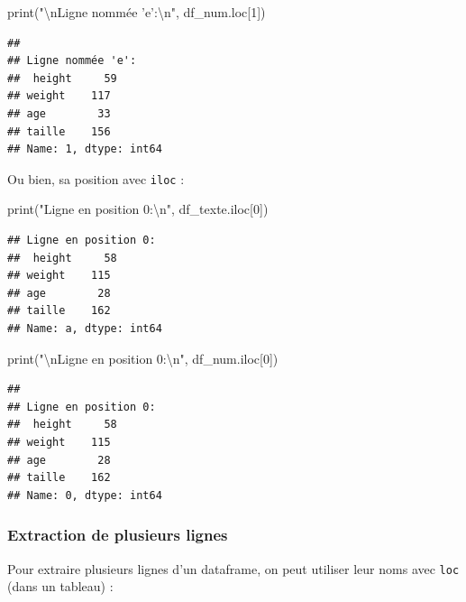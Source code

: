\documentclass[12pt,]{book}
\newenvironment{Shaded}{\begin{snugshade}}{\end{snugshade}}
\newcommand{\DecValTok}[1]{\textcolor[rgb]{0.00,0.00,0.81}{#1}}
\newcommand{\CharTok}[1]{\textcolor[rgb]{0.31,0.60,0.02}{#1}}
\newcommand{\StringTok}[1]{\textcolor[rgb]{0.31,0.60,0.02}{#1}}
\newcommand{\BuiltInTok}[1]{#1}
\newcommand{\NormalTok}[1]{#1}
\numberwithin{equation}{section}
\numberwithin{countremarque}{section}
\begin{document}
\begin{Shaded}
\begin{Highlighting}[]
\BuiltInTok{print}\NormalTok{(}\StringTok{"}\CharTok{\textbackslash{}n}\StringTok{Ligne nommée 'e':}\CharTok{\textbackslash{}n}\StringTok{"}\NormalTok{, df_num.loc[}\DecValTok{1}\NormalTok{])}
\end{Highlighting}
\end{Shaded}

\begin{lstlisting}
## 
## Ligne nommée 'e':
##  height     59
## weight    117
## age        33
## taille    156
## Name: 1, dtype: int64
\end{lstlisting}

Ou bien, sa position avec \texttt{iloc} :

\begin{Shaded}
\begin{Highlighting}[]
\BuiltInTok{print}\NormalTok{(}\StringTok{"Ligne en position 0:}\CharTok{\textbackslash{}n}\StringTok{"}\NormalTok{, df_texte.iloc[}\DecValTok{0}\NormalTok{])}
\end{Highlighting}
\end{Shaded}

\begin{lstlisting}
## Ligne en position 0:
##  height     58
## weight    115
## age        28
## taille    162
## Name: a, dtype: int64
\end{lstlisting}

\begin{Shaded}
\begin{Highlighting}[]
\BuiltInTok{print}\NormalTok{(}\StringTok{"}\CharTok{\textbackslash{}n}\StringTok{Ligne en position 0:}\CharTok{\textbackslash{}n}\StringTok{"}\NormalTok{, df_num.iloc[}\DecValTok{0}\NormalTok{])}
\end{Highlighting}
\end{Shaded}

\begin{lstlisting}
## 
## Ligne en position 0:
##  height     58
## weight    115
## age        28
## taille    162
## Name: 0, dtype: int64
\end{lstlisting}

\subsubsection{Extraction de plusieurs
lignes}\label{extraction-de-plusieurs-lignes}

Pour extraire plusieurs lignes d'un dataframe, on peut utiliser leur
noms avec \texttt{loc} (dans un tableau) :
\end{document}
